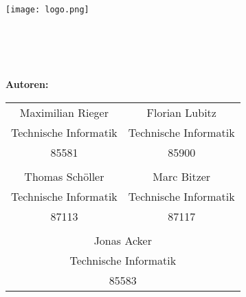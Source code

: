 \begin{titlepage}

\begin{center}
\texttt{[image: logo.png]}\\[5ex]


\large{\betreff}\\[3.5ex]

\LARGE{\textbf{\titel}}\\[1.5ex]
\large{\untertitel}\\[3.5ex]

\normalsize

\begin{tabular}{c c}

\end{tabular}

\textbf{\Large{Autoren:}}\\
    \begin{tabular}{c c}
        \\
        Maximilian Rieger & Florian Lubitz\\
        Technische Informatik & Technische Informatik\\
        85581 & 85900\\
        \\
        Thomas Schöller & Marc Bitzer\\
        Technische Informatik & Technische Informatik\\
        87113 & 87117\\
        \\
        \multicolumn{2}{c}{Jonas Acker}\\
        \multicolumn{2}{c}{Technische Informatik}\\
        \multicolumn{2}{c}{85583}\\
    \end{tabular}
\\[3ex]

\end{center}

\end{titlepage}